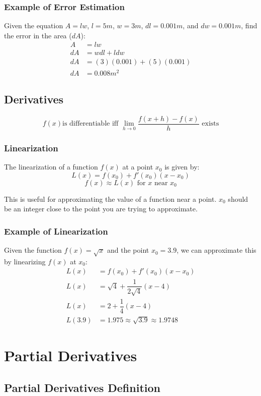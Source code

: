 \documentclass[a4paper,12pt,openany]{book}
\begin{document}
\subsubsection{Example of Error Estimation}
Given the equation $A = lw$, $l = 5m$, $w = 3m$, $dl = 0.001m$, and $dw = 0.001m$, find the error in the area ($dA$): 
\begin{align*}
    A &= lw\\
    dA &= wdl + ldw\\
    dA &= (3)(0.001) + (5)(0.001)\\
    dA &= 0.008m^2
\end{align*}
\subsection{Derivatives}

\[
    f(x) \text{is differentiable iff } \lim_{h \to 0} \dfrac{f(x+h) - f(x)}{h} \text{ exists}
\]
\subsubsection{Linearization}
The linearization of a function \(f(x)\) at a point \(x_0\) is given by:
\[
    L(x) = f(x_0) + f'(x_0)(x-x_0)
\]
\[
    f(x) \approx L(x) \text{ for } x \text{ near } x_0
\]

This is useful for approximating the value of a function near a point. $x_0$ should be an integer close to the point you are trying to approximate.
\subsubsection{Example of Linearization}
Given the function \(f(x) = \sqrt{x}\) and the point \(x_0 = 3.9\), we can approximate this by linearizing \(f(x)\) at \(x_0\):
\begin{align*}
    L(x) &= f(x_0) + f'(x_0)(x-x_0)\\
    L(x) &= \sqrt{4} + \dfrac{1}{2\sqrt{4}}(x-4)\\
    L(x) &= 2 + \dfrac{1}{4}(x-4)\\
    L(3.9) &= 1.975 \approx \sqrt{3.9} \approx 1.9748    
\end{align*}

\section{Partial Derivatives}
\subsection{Partial Derivatives Definition}
\end{document}
